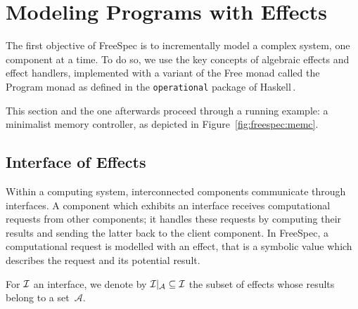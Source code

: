 \section{Modeling Programs with Effects}
\label{sec:freespec:specifying}

The first objective of FreeSpec is to incrementally model a complex system, one
component at a time.
%
To do so, we use the key concepts of algebraic effects and effect handlers,
implemented with a variant of the Free monad called the Program monad as defined
in the \texttt{operational} package of Haskell\,\cite{operational}.

This section and the one afterwards proceed through a running example: a
minimalist memory controller, as depicted in Figure~\ref{fig:freespec:memc}.

%

\subsection{Interface of Effects}

Within a computing system, interconnected components communicate through
interfaces.
%
A component which exhibits an interface receives computational requests from
other components; it handles these requests by computing their results and
sending the latter back to the client component.
%
In FreeSpec, a computational request is modelled with an effect, that is a
symbolic value which describes the request and its potential result.

For $\mathcal{I}$ an interface, we denote by $\mathcal{I}|_{\mathcal{A}} \subseteq \mathcal{I}$
the subset of effects whose results belong to a set~$\mathcal{A}$.

